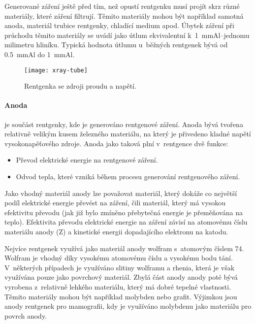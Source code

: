 Generované záření ještě před tím, než opustí rentgenku musí projít skrz různé materiály, které záření filtrují. Těmito materiály mohou být například samotná anoda, materiál trubice rentgenky, chladící medium apod. Úbytek záření při průchodu těmito materiály se uvádí jako útlum ekvivalentní k~\SI{1}{\mm}Al--jednomu milimetru hliníku. Typická hodnota útlumu u~běžných rentgenek bývá od \SI{0.5}{\mm}Al do \SI{1}{\mm}Al. 

\begin{figure}[hb]
\texttt{[image: xray-tube]}
\caption{Rentgenka se zdroji proudu a napětí. \cite[str. 93]{Diagnostic-Radiology-Physics}}
\label{fig:xray-tube}
\centering
\end{figure}

\paragraph{Anoda}
je součást rentgenky, kde je generováno rentgenové záření. Anoda bývá tvořena relativně velikým kusem železného materiálu, na který je přivedeno kladné napětí vysokonapěťového zdroje. Anoda jako taková plní v~rentgence dvě funkce:
\begin{itemize}
\item Převod elektrické energie na rentgenové záření.
\item Odvod tepla, které vzniká během procesu generování rentgenového záření.
\end{itemize}
Jako vhodný materiál anody lze považovat materiál, který dokáže co největší podíl elektrické energie převést na záření, čili materiál, který má vysokou efektivitu převodu (jak již bylo zmíněno přebytečná energie je přeměňována na teplo). Efektivita převodu elektrické energie na záření závisí na atomovému číslu materiálu anody (Z) a kinetické energii dopadajícího elektronu na katodu.\cite{The-Physical-Principles-of-Medical-Imaging}

Nejvíce rentgenek využívá jako materiál anody wolfram s~atomovým číslem 74. Wolfram je vhodný díky vysokému atomovému číslu a vysokému bodu tání. V~některých případech je využíváno slitiny wolframu a rhenia, která je však využívána pouze jako povrchový materiál. Zbylá část anody anody poté bývá vyrobena z~relativně lehkého materiálu, který má dobré tepelné vlastnosti. Těmito materiály mohou být například molybden nebo grafit. Výjimkou jsou anody rentgenek pro mamografii, kdy je využíváno molybdenu jako materiálu pro povrch anody.\cite{The-Physical-Principles-of-Medical-Imaging}

